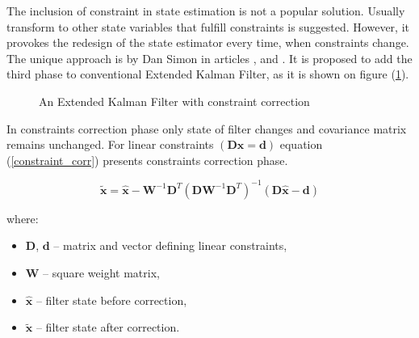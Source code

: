 The inclusion of constraint in state estimation is not a popular solution. Usually transform to other state variables that fulfill constraints is suggested. However, it provokes the redesign of the state estimator every time, when constraints change. The unique approach is by Dan Simon in articles \cite{simon}, \cite{simon2010kalman} and \cite{simon2006kalman}. It is proposed to add the third phase to conventional Extended Kalman Filter, as it is shown on figure (\ref{ekf_three_phases}).

\begin{figure}[!h]
	\begin{center}
	\end{center}
	\caption{An Extended Kalman Filter with constraint correction}
	\label{ekf_three_phases}
\end{figure}

In constraints correction phase only state of filter changes and covariance matrix remains unchanged. For linear constraints $\left( \bm{D} \bm{x} = \bm{d}  \right)$ equation (\ref{constraint_corr}) presents constraints correction phase.

\begin{equation}
	\bm{\tilde{x}} = \bm{\hat{x}} - \bm{W}^{-1} \bm{D}^T \left( \bm{D} \bm{W}^{-1} \bm{D}^T \right)^{-1} \left( \bm{D} \bm{\hat{x}} - \bm{d}  \right)
	\label{constraint_corr}
\end{equation}

where:
\begin{itemize}[noitemsep]
	\item $\bm{D}$, $\bm{d}$ -- matrix and vector defining linear constraints,
	\item $\bm{W}$ -- square weight matrix,
	\item $\bm{\hat{x}}$ -- filter state before correction,
	\item $\bm{\tilde{x}}$ -- filter state after correction.
\end{itemize}


